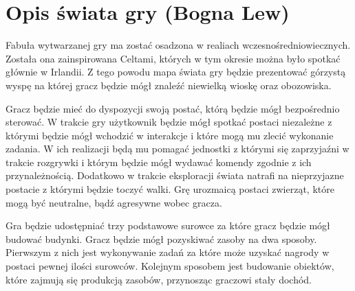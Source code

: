 \section{Opis świata gry (Bogna Lew)}
Fabuła wytwarzanej gry ma zostać osadzona w realiach wczesnośredniowiecznych. Została ona zainspirowana Celtami, których
w tym okresie można było spotkać głównie w Irlandii. Z tego powodu mapa świata gry będzie prezentować górzystą wyspę na
której gracz będzie mógł znaleźć niewielką wioskę oraz obozowiska.

Gracz będzie mieć do dyspozycji swoją postać, którą będzie mógł bezpośrednio sterować. W trakcie gry użytkownik będzie
mógł spotkać postaci niezależne z którymi będzie mógł wchodzić w interakcje i które mogą mu zlecić wykonanie zadania.
W ich realizacji będą mu pomagać jednostki z którymi się zaprzyjaźni w trakcie rozgrywki i którym będzie mógł wydawać
komendy zgodnie z ich przynależnością. Dodatkowo w trakcie eksploracji świata natrafi na nieprzyjazne postacie z którymi
będzie toczyć walki. Grę urozmaicą postaci zwierząt, które mogą być neutralne, bądź agresywne wobec gracza.

Gra będzie udostępniać trzy podstawowe surowce za które gracz będzie mógł budować budynki. Gracz będzie mógł pozyskiwać
zasoby na dwa sposoby. Pierwszym z nich jest wykonywanie zadań za które może uzyskać nagrody w postaci pewnej ilości
surowców. Kolejnym sposobem jest budowanie obiektów, które zajmują się produkcją zasobów, przynosząc graczowi stały
dochód.
